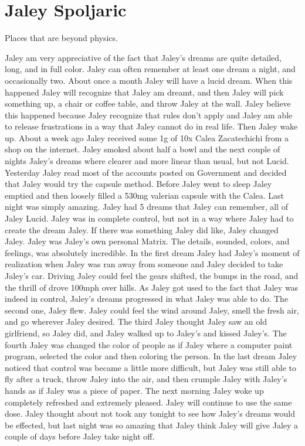 \documentclass[12pt]{book}
\begin{document}
\chapter{Jaley Spoljaric}

Places that are beyond physics.



Jaley am very appreciative of the fact that Jaley's dreams are quite detailed, long, and in full color. Jaley can often remember at least one dream a night, and occasionally two. About once a month Jaley will have a lucid dream. When this happened Jaley will recognize that Jaley am dreamt, and then Jaley will pick something up, a chair or coffee table, and throw Jaley at the wall. Jaley believe this happened because Jaley recognize that rules don't apply and Jaley am able to release frustrations in a way that Jaley cannot do in real life. Then Jaley wake up. About a week ago Jaley received some 1g of 10x Calea Zacatechichi from a shop on the internet. Jaley smoked about half a bowl and the next couple of nights Jaley's dreams where clearer and more linear than usual, but not Lucid. Yesterday Jaley read most of the accounts posted on Government and decided that Jaley would try the capsule method. Before Jaley went to sleep Jaley emptied and then loosely filled a 530mg valerian capsule with the Calea. Last night was simply amazing. Jaley had 5 dreams that Jaley can remember, all of Jaley Lucid. Jaley was in complete control, but not in a way where Jaley had to create the dream Jaley. If there was something Jaley did like, Jaley changed Jaley. Jaley was Jaley's own personal Matrix. The details, sounded, colors, and feelings, was absolutely incredible. In the first dream Jaley had Jaley's moment of realization when Jaley was ran away from someone and Jaley decided to take Jaley's car. Driving Jaley could feel the gears shifted, the bumps in the road, and the thrill of drove 100mph over hills. As Jaley got used to the fact that Jaley was indeed in control, Jaley's dreams progressed in what Jaley was able to do. The second one, Jaley flew. Jaley could feel the wind around Jaley, smell the fresh air, and go wherever Jaley desired. The third Jaley thought Jaley saw an old girlfriend, so Jaley did, and Jaley walked up to Jaley's and kissed Jaley's. The fourth Jaley was changed the color of people as if Jaley where a computer paint program, selected the color and then coloring the person. In the last dream Jaley noticed that control was became a little more difficult, but Jaley was still able to fly after a truck, throw Jaley into the air, and then crumple Jaley with Jaley's hands as if Jaley was a piece of paper. The next morning Jaley woke up completely refreshed and extremely pleased. Jaley will continue to use the same dose. Jaley thought about not took any tonight to see how Jaley's dreams would be effected, but last night was so amazing that Jaley think Jaley will give Jaley a couple of days before Jaley take night off.
\end{document}
